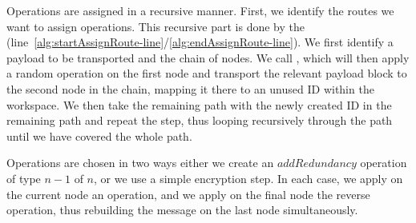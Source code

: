 Operations are assigned in a recursive manner. First, we identify the routes we want to assign operations. This recursive part is done by the  (line~\ref{alg:startAssignRoute-line}\-/\ref{alg:endAssignRoute-line}). We first identify a payload to be transported and the chain of nodes. We call , which will then apply a random operation on the first node and transport the relevant payload block to the second node in the chain, mapping it there to an unused ID within the workspace. We then take the remaining path with the newly created ID in the remaining path and repeat the step, thus looping recursively through the path until we have covered the whole path.

Operations are chosen in two ways either we create an $addRedundancy$ operation of type $n-1$ of $n$, or we use a simple encryption step. In each case, we apply on the current node an operation, and we apply on the final node the reverse operation, thus rebuilding the message on the last node simultaneously.

